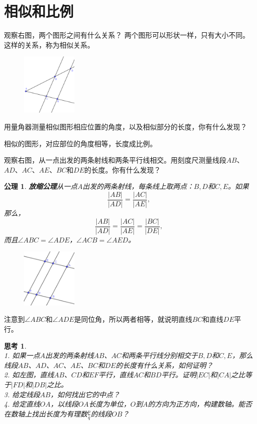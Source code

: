 \documentclass[12pt,UTF8]{ctexbook}
\newtheorem{sk}{思考}[section]
\newtheorem{po}{公理}
\begin{document}
\section{相似和比例}
观察右图，两个图形之间有什么关系？
两个图形可以形状一样，只有大小不同。
这样的关系，称为相似关系。

\begin{figure} %
    \vspace{-10pt}
    \includegraphics[width=0.24\textwidth]{比例1.png}
\end{figure}

用量角器测量相似图形相应位置的角度，以及相似部分的长度，你有什么发现？

相似的图形，对应部位的角度相等，长度成比例。

观察右图，从一点出发的两条射线和两条平行线相交。用刻度尺测量线段$AB$、$AD$、$AC$、$AE$、$BC$和$DE$的长度。你有什么发现？
\begin{po}{\textbf{放缩公理}}\label{po:6}
    从一点$A$出发的两条射线，每条线上取两点：$B,D$和$C,E$。如果
    $$ \frac{|AB|}{|AD|} = \frac{|AC|}{|AE|},$$
    那么，
    $$ \frac{|AB|}{|AD|} = \frac{|AC|}{|AE|} = \frac{|BC|}{|DE|},$$
    而且$\angle ABC = \angle ADE$，$\angle ACB = \angle AED$。
\end{po}
\begin{figure} %
    \vspace{-10pt}
    \includegraphics[width=0.24\textwidth]{比例2.png}
\end{figure}

注意到$\angle ABC$和$\angle ADE$是同位角，所以两者相等，就说明直线$BC$和直线$DE$平行。

\begin{sk}\label{sk:1-2-0}
    \mbox{}\\
    1. 如果一点$A$出发的两条射线$AB$、$AC$和两条平行线分别相交于$B,D$和$C,E$，那么线段$AB$、$AD$、$AC$、$AE$、$BC$和$DE$的长度有什么关系，如何证明？\\
    2. 如左图，直线$AB$、$CD$和$EF$平行，直线$AC$和$BD$平行。证明$|EC|$和$|CA|$之比等于$|FD|$和$|DB|$之比。\\
    3. 给定线段$AB$，如何找出它的中点？\\
    4. 给定直线$OA$，以线段$OA$长度为单位，$O$到$A$的方向为正方向，构建数轴。能否在数轴上找出长度为有理数$\frac{p}{q}$的线段$OB$？
\end{sk}
\end{document}

